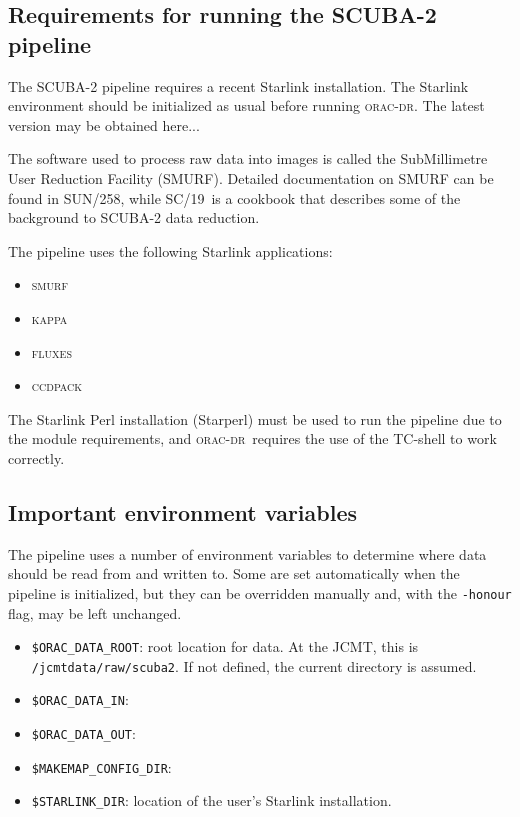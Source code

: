 \documentclass[twoside,11pt]{article}
\newcommand{\xref}[3]{#1}
\renewcommand{\_}{\texttt{\symbol{95}}}
\newcommand{\CCDPACK}{\textsc{ccdpack}}
\newcommand{\FLUXES}{\textsc{fluxes}}
\newcommand{\KAPPA}{\textsc{kappa}}
\newcommand{\SMURF}{\textsc{smurf}}
\newcommand{\SMURFcook}{\xref{SC/19}{sc19}{}}
\newcommand{\SMURFsun}{\xref{SUN/258}{sun258}{}}
\newcommand{\oracdr}{\textsc{orac-dr}}
\begin{document}
\subsection{Requirements for running the SCUBA-2 pipeline}

The SCUBA-2 pipeline requires a recent Starlink installation. The
Starlink environment should be initialized as usual before running
\oracdr. The latest version may be obtained here...

The software used to process raw data into images is called the
SubMillimetre User Reduction Facility (SMURF). Detailed documentation
on SMURF can be found in \SMURFsun, while \SMURFcook\ is a cookbook
that describes some of the background to SCUBA-2 data reduction.

The pipeline uses the following Starlink applications:

\begin{itemize}
\item \SMURF
\item \KAPPA
\item \FLUXES
\item \CCDPACK
\end{itemize}

The Starlink Perl installation (Starperl) must be used to run the
pipeline due to the module requirements, and \oracdr\ requires the use
of the TC-shell to work correctly.

\subsection{Important environment variables}

The pipeline uses a number of environment variables to determine where
data should be read from and written to. Some are set automatically
when the pipeline is initialized, but they can be overridden manually
and, with the \verb+-honour+ flag, may be left unchanged.

\begin{itemize}

\item \verb+$ORAC_DATA_ROOT+: root location for data. At the JCMT,
  this is \verb+/jcmtdata/raw/scuba2+. If not defined, the current
  directory is assumed.

\item \verb+$ORAC_DATA_IN+:

\item \verb+$ORAC_DATA_OUT+:

\item \verb+$MAKEMAP_CONFIG_DIR+:

\item \verb+$STARLINK_DIR+: location of the user's Starlink
  installation.


\end{itemize}
\end{document}
